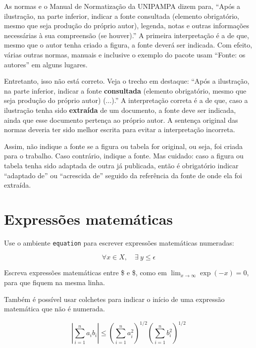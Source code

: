 As normas  e o Manual de Normatização da UNIPAMPA \cite{SisbiUnipampa2011} dizem para, ``Após a ilustração, na parte inferior, indicar a fonte consultada (elemento obrigatório, mesmo que seja produção do próprio autor), legenda, notas e outras informações necessárias à sua compreensão (se houver).''
  A primeira interpretação é a de que, mesmo que o autor tenha criado a figura, a fonte deverá ser indicada.
  Com efeito, várias outras normas, manuais e inclusive o exemplo do pacote  usam ``Fonte: os autores'' em alguns lugares.

Entretanto, isso não está correto.
  Veja o trecho em destaque: ``Após a ilustração, na parte inferior, indicar a fonte \textbf{consultada} (elemento obrigatório, mesmo que seja produção do próprio autor) (...).''
  A interpretação correta é a de que, caso a ilustração tenha sido \textbf{extraída} de um documento, a fonte deve ser indicada, ainda que esse documento pertença ao próprio autor.
  A sentença original das normas deveria ter sido melhor escrita para evitar a interpretação incorreta.

Assim, não indique a fonte se a figura ou tabela for original, ou seja, foi criada para o trabalho.
  Caso contrário, indique a fonte.
  Mas cuidado: caso a figura ou tabela tenha sido adaptada de outra já publicada, então é obrigatório indicar ``adaptado de'' ou ``acrescida de'' seguido da referência da fonte de onde ela foi extraída.


\section{Expressões matemáticas}

Use o ambiente \texttt{equation} para escrever expressões matemáticas numeradas:

\begin{equation}
  \forall x \in X, \quad \exists \: y \leq \epsilon
\end{equation}

Escreva expressões matemáticas entre \$ e \$, como em $\lim_{x \to \infty} \exp(-x) = 0$, para que fiquem na mesma linha.

Também é possível usar colchetes para indicar o início de uma expressão matemática que não é numerada.

\[
\left|\sum_{i=1}^n a_ib_i\right|
\le
\left(\sum_{i=1}^n a_i^2\right)^{1/2}
\left(\sum_{i=1}^n b_i^2\right)^{1/2}
\]

